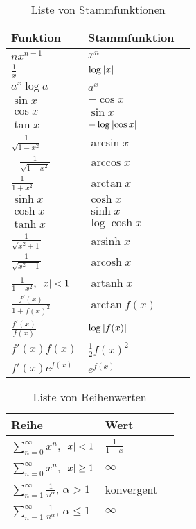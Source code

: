 \documentclass[a4paper]{article}
\theoremstyle{marginbreak}
\DeclareMathOperator{\arsinh}{arsinh}
\DeclareMathOperator{\arcosh}{arcosh}
\DeclareMathOperator{\artanh}{artanh}
\begin{document}
	\begin{multicols}{2}
		\begin{table}[H]
			\centering
			\begin{tabular}{ | M{2.5cm} | M{2.5cm} | N}
				\hline
				Funktion & Stammfunktion & \\[0.6cm] \hline \hline
				$nx^{n-1}$ & $x^n$ & \\[0.6cm] \hline
				$\frac{1}{x}$ & $\log\abs{x}$ & \\[0.6cm] \hline
				$a^x\log a$ & $a^x$ & \\[0.6cm] \hline \hline
				$\sin x$ & $-\cos x$ & \\[0.6cm] \hline
				$\cos x$ & $\sin x$ & \\[0.6cm] \hline
				$\tan x$ & $-\log\abs{\cos x}$ & \\[0.6cm] \hline \hline
				$\frac{1}{\sqrt{1-x^2}}$ & $\arcsin x$ & \\[0.6cm] \hline
				$-\frac{1}{\sqrt{1-x^2}}$ & $\arccos x$ & \\[0.6cm] \hline
				$\frac{1}{1+x^2}$ & $\arctan x$ & \\[0.6cm] \hline \hline
				$\sinh x$ & $\cosh x$ & \\[0.6cm] \hline
				$\cosh x$ & $\sinh x$ & \\[0.6cm] \hline
				$\tanh x$ & $\log\cosh x$ & \\[0.6cm] \hline \hline
				$\frac{1}{\sqrt{x^2+1}}$ & $\arsinh x$ & \\[0.6cm] \hline
				$\frac{1}{\sqrt{x^2-1}}$ & $\arcosh x$ & \\[0.6cm] \hline
				$\frac{1}{1-x^2}$, $\abs{x}<1$ & $\artanh x$ & \\[0.6cm] \hline \hline
				$\frac{f'(x)}{1+f(x)^2}$ & $\arctan f(x)$ & \\[0.6cm] \hline
				$\frac{f'(x)}{f(x)}$ & $\log\abs{f(x)}$ & \\[0.6cm] \hline
				$f'(x)f(x)$ & $\frac{1}{2}f(x)^2$ & \\[0.6cm] \hline
				$f'(x)e^{f(x)}$ & $e^{f(x)}$ & \\[0.6cm] \hline
			\end{tabular}
			\caption{Liste von Stammfunktionen}
		\end{table}
		\begin{table}[H]
			\centering
			\begin{tabular}{ | M{2.5cm} | M{2.5cm} | N}
				\hline
				Reihe & Wert & \\[0.6cm] \hline \hline
				$\sum\limits_{n=0}^\infty x^n$, $\abs{x}<1$ & $\frac{1}{1-x}$ & \\[0.6cm] \hline
				$\sum\limits_{n=0}^\infty x^n$, $\abs{x}\geq1$ & $\infty$ & \\[0.6cm] \hline \hline
				$\sum\limits_{n=1}^\infty\frac{1}{n^\alpha}$, $\alpha > 1$ & konvergent & \\[0.6cm] \hline
				$\sum\limits_{n=1}^\infty\frac{1}{n^\alpha}$, $\alpha \leq 1$ & $\infty$ & \\[0.6cm] \hline
			\end{tabular}
			\caption{Liste von Reihenwerten}
		\end{table}
	\end{multicols}
\end{document}
